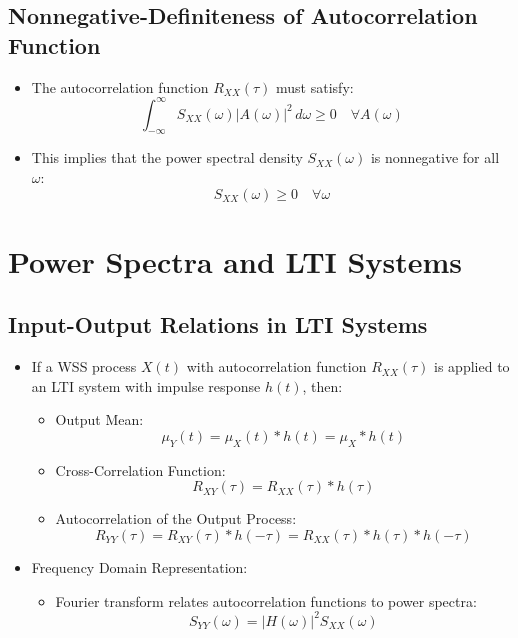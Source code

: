 \documentclass[12pt]{article}
\begin{document}
\subsection{Nonnegative-Definiteness of Autocorrelation Function}
\begin{itemize}
    \item The autocorrelation function \( R_{XX}(\tau) \) must satisfy:
    \[
    \int_{-\infty}^{\infty} S_{XX}(\omega) |A(\omega)|^2 \, d\omega \geq 0 \quad \forall A(\omega)
    \]
    \item This implies that the power spectral density \( S_{XX}(\omega) \) is nonnegative for all \( \omega \):
    \[
    S_{XX}(\omega) \geq 0 \quad \forall \omega
    \]
\end{itemize}

\section{Power Spectra and LTI Systems}

\subsection{Input-Output Relations in LTI Systems}
\begin{itemize}
    \item If a WSS process \( X(t) \) with autocorrelation function \( R_{XX}(\tau) \) is applied to an LTI system with impulse response \( h(t) \), then:
    \begin{itemize}
        \item Output Mean:
        \[
        \mu_Y(t) = \mu_X(t) * h(t) = \mu_X * h(t)
        \]
        \item Cross-Correlation Function:
        \[
        R_{XY}(\tau) = R_{XX}(\tau) * h(\tau)
        \]
        \item Autocorrelation of the Output Process:
        \[
        R_{YY}(\tau) = R_{XY}(\tau) * h(-\tau) = R_{XX}(\tau) * h(\tau) * h(-\tau)
        \]
    \end{itemize}
    \item Frequency Domain Representation:
    \begin{itemize}
        \item Fourier transform relates autocorrelation functions to power spectra:
        \[
        S_{YY}(\omega) = |H(\omega)|^2 S_{XX}(\omega)
        \]
    \end{itemize}
\end{itemize}
\end{document}

